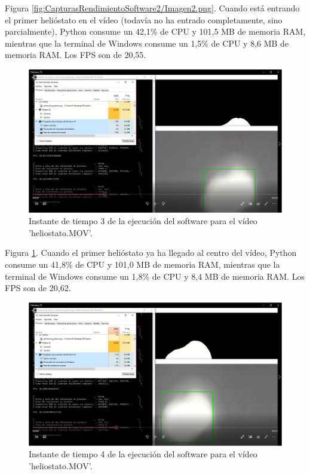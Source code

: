 Figura \ref{fig:CapturasRendimientoSoftware2/Imagen2.png}. Cuando está entrando el primer helióstato en el vídeo (todavía no ha entrado completamente, sino parcialmente), Python consume un 42,1\% de CPU y 101,5 MB de memoria RAM, mientras que la terminal de Windows consume un 1,5\% de CPU y 8,6 MB de memoria RAM. Los FPS son de 20,55.

\begin{figure}[h!]
  	\centering
	\includegraphics[width=\textwidth]{CapturasRendimientoSoftware2/Imagen3.png}
	\caption{Instante de tiempo 3 de la ejecución del software para el vídeo 'heliostato.MOV'.
	\label{fig:CapturasRendimientoSoftware2/Imagen3.png}}
\end{figure}

Figura \ref{fig:CapturasRendimientoSoftware2/Imagen3.png}. Cuando el primer helióstato ya ha llegado al centro del vídeo, Python consume un 41,8\% de CPU y 101,0 MB de memoria RAM, mientras que la terminal de Windows consume un 1,8\% de CPU y 8,4 MB de memoria RAM. Los FPS son de 20,62.

\begin{figure}[h!]
  	\centering
	\includegraphics[width=\textwidth]{CapturasRendimientoSoftware2/Imagen4.png}
	\caption{Instante de tiempo 4 de la ejecución del software para el vídeo 'heliostato.MOV'.
	\label{fig:CapturasRendimientoSoftware2/Imagen4.png}}
\end{figure}

